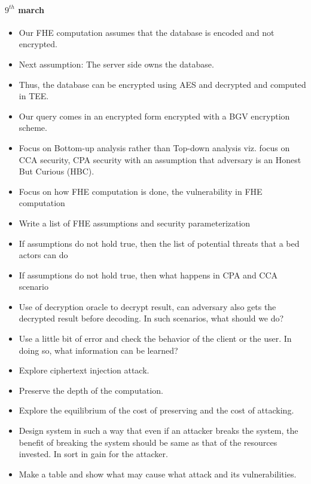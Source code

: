 \paragraph {$9^{th}$ march}
\begin{itemize}
    \item Our FHE computation assumes that the database is encoded and not encrypted.
    \item Next assumption: The server side owns the database.
    \item Thus, the database can be encrypted using AES and decrypted and computed in TEE.
    \item Our query comes in an encrypted form encrypted with a BGV encryption scheme.
    \item Focus on Bottom-up analysis rather than Top-down analysis viz. focus on CCA security, CPA security with an assumption that adversary is an Honest But Curious (HBC).
    \item Focus on how FHE computation is done, the vulnerability in FHE computation
    \item Write a list of FHE assumptions and security parameterization
    \item If assumptions do not hold true, then the list of potential threats that a bed actors can do
    \item If assumptions do not hold true, then what happens in CPA and CCA scenario
    \item Use of decryption oracle to decrypt result, can adversary also gets the decrypted result before decoding. In such scenarios, what should we do?
    \item Use a little bit of error and check the behavior of the client or the user. In doing so, what information can be learned?
    \item Explore ciphertext injection attack.
    \item Preserve the depth of the computation.
    \item Explore the equilibrium of the cost of preserving and the cost of attacking.
    \item Design system in such a way that even if an attacker breaks the system, the benefit of breaking the system should be same as that of the resources invested. In sort in gain for the attacker.
    \item Make a table and show what may cause what attack and its vulnerabilities.


\end{itemize}
